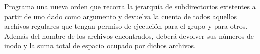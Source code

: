 \begin{exercise}
Programa una nueva orden que recorra la jerarquía de subdirectorios
existentes a partir de uno dado como argumento y devuelva la cuenta de todos aquellos
archivos regulares que tengan permiso de ejecución para el grupo y para otros. Además del
nombre de los archivos encontrados, deberá devolver sus números de inodo y la suma total de
espacio ocupado por dichos archivos.

\end{exercise}